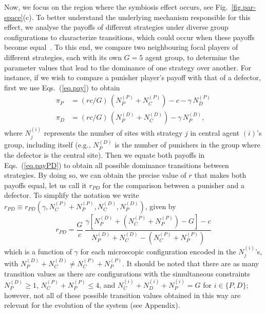 \documentclass[5p]{elsarticle}
\def\NDP{N^{{\scriptscriptstyle(D)}}_{P}}
\def\NDC{N^{{\scriptscriptstyle(D)}}_{C}}
\def\NPP{N^{{\scriptscriptstyle(P)}}_{P}}
\def\NPC{N^{{\scriptscriptstyle(P)}}_{C}}
\def\NIJ{N^{{\scriptscriptstyle(i)}}_{j}}
\begin{document}
Now, we focus on the region where the symbiosis effect occurs, see Fig.~\ref{fig.par-space}(c). To better understand the underlying mechanism responsible for this effect, we { analyse the payoffs of different strategies under diverse group configurations to characterize transitions, which could occur when these payoffs become equal}~\cite{Vainstein2014b}.{ To this end, we compare two neighbouring focal players of different strategies, each with its own $G=5$ agent group, to determine the parameter values that lead to the dominance of one strategy over another.}
%
{For instance, if we wish to compare a punisher player's payoff with that of a defector, first we  use } Eqs.~(\ref{eq.pay}) {to obtain}
\begin{subequations}\label{eq.payPD}
\begin{align}
\pi_P &= (r c/G)\,(N^{{\scriptscriptstyle(P)}}_{P}+N^{{\scriptscriptstyle(P)}}_{C}) - c - \gamma\,N^{{\scriptscriptstyle(P)}}_{D} \\ 
\pi_D &= (r c/G)\,(N^{{\scriptscriptstyle(D)}}_{P}+N^{{\scriptscriptstyle(D)}}_{C}) - \gamma\,N^{{\scriptscriptstyle(D)}}_{P},
\end{align}
\end{subequations}
{where $\NIJ$ represents the number of sites with strategy  $j$ in central agent $(i)$'s  group, including itself (e.g., $N^{{\scriptscriptstyle(D)}}_{P}$ is the number of  punishers in the group where the defector is the central site). Then we equate both payoffs in Eqs.}~(\ref{eq.payPD}){ to obtain all possible dominance transitions between strategies. By doing so, we can obtain the precise value of $r$ that makes both payoffs equal, let us call it $r_{PD}$  for the comparison between a punisher and a defector. To simplify the notation we write $r_{PD}\equiv r_{PD}(\gamma, \NPC+\NPP,\NDC,\NDP) $, given by}
%
\begin{equation} \label{eq.payPD-result}
r_{PD}=\frac{G}{c} \; \frac{\gamma[\NDP+(\NPC+\NPP)-G]-c}{\NDP+\NDC-(\NPC+\NPP)}
\end{equation}
{which is a function of $\gamma$ for each microscopic configuration encoded in the $N^{{\scriptscriptstyle(i)}}_{j}$'s, with $\NDP+\NDC \neq \NPC+\NPP$. It should be noted that there are as many transition values as there are configurations with the simultaneous constraints $\NDP\geq 1 $, $\NPC+\NPP \leq 4$,  and $N^{\scriptscriptstyle(i)}_C + N^{\scriptscriptstyle(i)}_D + N^{\scriptscriptstyle(i)}_P=G$ for $i\in\{P,D\}$;  however, not all of these possible transition values obtained in this way are relevant for the evolution of the system (see Appendix).}
\end{document}
